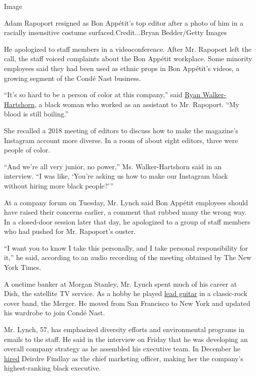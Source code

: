 Image

Adam Rapoport resigned as Bon Appétit's top editor after a photo of him
in a racially insensitive costume surfaced.Credit...Bryan Bedder/Getty
Images

He apologized to staff members in a videoconference. After Mr. Rapoport
left the call, the staff voiced complaints about the Bon Appétit
workplace. Some minority employees said they had been used as ethnic
props in Bon Appétit's videos, a growing segment of the Condé Nast
business.

``It's so hard to be a person of color at this company,'' said
\href{https://www.instagram.com/ry_who/}{Ryan Walker-Hartshorn}, a black
woman who worked as an assistant to Mr. Rapoport. ``My blood is still
boiling.''

She recalled a 2018 meeting of editors to discuss how to make the
magazine's Instagram account more diverse. In a room of about eight
editors, three were people of color.

``And we're all very junior, no power,'' Ms. Walker-Hartshorn said in an
interview. ``I was like, `You're asking us how to make our Instagram
black without hiring more black people?'''

At a company forum on Tuesday, Mr. Lynch said Bon Appétit employees
should have raised their concerns earlier, a comment that rubbed many
the wrong way. In a closed-door session later that day, he apologized to
a group of staff members who had pushed for Mr. Rapoport's ouster.

``I want you to know I take this personally, and I take personal
responsibility for it,'' he said, according to an audio recording of the
meeting obtained by The New York Times.

A onetime banker at Morgan Stanley, Mr. Lynch spent much of his career
at Dish, the satellite TV service. As a hobby he played
\href{https://twitter.com/rogerlynch/status/885913558512488448?lang=en}{lead
guitar} in a classic-rock cover band, the Merger. He moved from San
Francisco to New York and updated his wardrobe to join Condé Nast.

Mr. Lynch, 57, has emphasized diversity efforts and environmental
programs in emails to the staff. He said in the interview on Friday that
he was developing an overall company strategy as he assembled his
executive team. In December he
\href{https://www.condenast.com/news/new-cfo-and-cmo}{hired} Deirdre
Findlay as the chief marketing officer, making her the company's
highest-ranking black executive.

